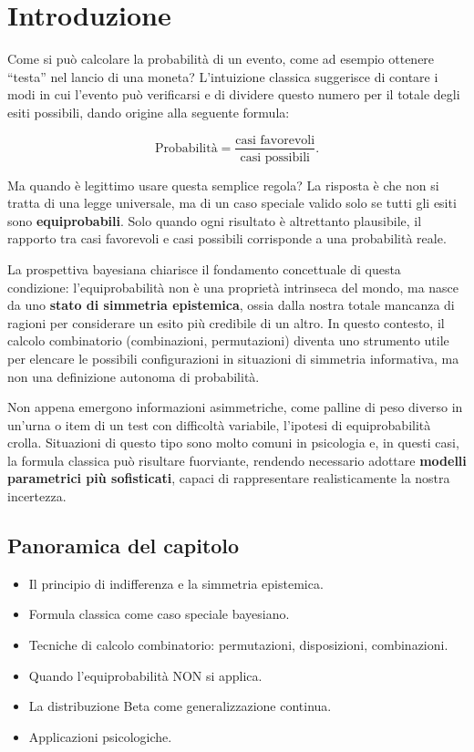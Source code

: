 \documentclass[
  letterpaper,
  DIV=11,
  numbers=noendperiod,
  oneside]{scrreprt}
\providecommand{\tightlist}{%
  \setlength{\itemsep}{0pt}\setlength{\parskip}{0pt}}
\theoremstyle{definition}
\theoremstyle{plain}
\theoremstyle{definition}
\theoremstyle{remark}
\begin{document}
\section*{Introduzione}\label{introduzione-3}


Come si può calcolare la probabilità di un evento, come ad esempio
ottenere ``testa'' nel lancio di una moneta? L'intuizione classica
suggerisce di contare i modi in cui l'evento può verificarsi e di
dividere questo numero per il totale degli esiti possibili, dando
origine alla seguente formula:

\[
\text{Probabilità} = \frac{\text{casi favorevoli}}{\text{casi possibili}}.
\]

Ma quando è legittimo usare questa semplice regola? La risposta è che
non si tratta di una legge universale, ma di un caso speciale valido
solo se tutti gli esiti sono \textbf{equiprobabili}. Solo quando ogni
risultato è altrettanto plausibile, il rapporto tra casi favorevoli e
casi possibili corrisponde a una probabilità reale.

La prospettiva bayesiana chiarisce il fondamento concettuale di questa
condizione: l'equiprobabilità non è una proprietà intrinseca del mondo,
ma nasce da uno \textbf{stato di simmetria epistemica}, ossia dalla
nostra totale mancanza di ragioni per considerare un esito più credibile
di un altro. In questo contesto, il calcolo combinatorio (combinazioni,
permutazioni) diventa uno strumento utile per elencare le possibili
configurazioni in situazioni di simmetria informativa, ma non una
definizione autonoma di probabilità.

Non appena emergono informazioni asimmetriche, come palline di peso
diverso in un'urna o item di un test con difficoltà variabile, l'ipotesi
di equiprobabilità crolla. Situazioni di questo tipo sono molto comuni
in psicologia e, in questi casi, la formula classica può risultare
fuorviante, rendendo necessario adottare \textbf{modelli parametrici più
sofisticati}, capaci di rappresentare realisticamente la nostra
incertezza.

\subsection*{Panoramica del capitolo}\label{panoramica-del-capitolo-2}

\begin{itemize}
\tightlist
\item
  Il principio di indifferenza e la simmetria epistemica.
\item
  Formula classica come caso speciale bayesiano.
\item
  Tecniche di calcolo combinatorio: permutazioni, disposizioni,
  combinazioni.
\item
  Quando l'equiprobabilità NON si applica.
\item
  La distribuzione Beta come generalizzazione continua.
\item
  Applicazioni psicologiche.
\end{itemize}
\end{document}
